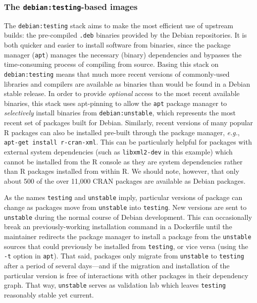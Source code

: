 \subsubsection{\texorpdfstring{The \texttt{debian:testing}-based
images}{The debian:testing-based images}}\label{the-debiantesting-based-images}

The \texttt{debian:testing} stack aims to make the most efficient use of
upstream builds: the pre-compiled \texttt{.deb} binaries provided by the
Debian repositories. It is both quicker and easier to install software
from binaries, since the package manager (\texttt{apt}) manages the
necessary (binary) dependencies and bypasses the time-consuming process
of compiling from source. Basing this stack on \texttt{debian:testing}
means that much more recent versions of commonly-used libraries and
compilers are available as binaries than would be found in a Debian
stable release. In order to provide \emph{optional} access to the most
recent available binaries, this stack uses apt-pinning
\citep{apt_pinning} to allow the \texttt{apt} package manager to
\emph{selectively} install binaries from \texttt{debian:unstable}, which
represents the most recent set of packages built for Debian. Similarly,
recent versions of many popular R packages can also be installed
pre-built through the package manager, \emph{e.g.},
\texttt{apt-get\ install\ r-cran-xml}. This can be particularly helpful
for packages with external system dependencies (such as
\texttt{libxml2-dev} in this example) which cannot be installed from the
R console as they are system dependencies rather than R packages
installed from within R. We should note, however, that only about 500 of
the over 11,000 CRAN packages are available as Debian packages.

As the names \texttt{testing} and \texttt{unstable} imply, particular
versions of package can change as packages move from \texttt{unstable}
into \texttt{testing}. New versions are sent to \texttt{unstable} during
the normal course of Debian development. This can occasionally break an
previously-working installation command in a Dockerfile until the
maintainer redirects the package manager to install a package from the
\texttt{unstable} sources that could previously be installed from
\texttt{testing}, or vice versa (using the \texttt{-t} option in
\texttt{apt}). That said, packages only migrate from \texttt{unstable}
to \texttt{testing} after a period of several days---and if the
migration and installation of the particular version is free of
interactions with other packages in their dependency graph. That way,
\texttt{unstable} serves as validation lab which leaves \texttt{testing}
reasonably stable yet current.

